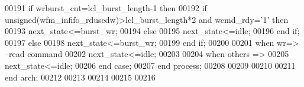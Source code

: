 \begin{DoxyCode}
00191             \textcolor{keywordflow}{if} \textcolor{vhdlchar}{wrburst_cnt}\textcolor{vhdlchar}{=}\textcolor{vhdlchar}{lcl_burst_length}\textcolor{vhdlchar}{-}\textcolor{vhdllogic}{}\textcolor{vhdllogic}{1} \textcolor{keywordflow}{then} 
00192                 \textcolor{keywordflow}{if} \textcolor{comment}{unsigned}\textcolor{vhdlchar}{(}\textcolor{vhdlchar}{wfm_infifo_rdusedw}\textcolor{vhdlchar}{)}\textcolor{vhdlchar}{>}\textcolor{vhdlchar}{lcl_burst_length}\textcolor{vhdlchar}{*}\textcolor{vhdllogic}{}\textcolor{vhdllogic}{2} \textcolor{keywordflow}{and} \textcolor{vhdlchar}{wcmd_rdy}\textcolor{vhdlchar}{=}\textcolor{vhdlchar}{'}\textcolor{vhdllogic}{}\textcolor{vhdllogic}{1}\textcolor{vhdlchar}{'} \textcolor{keywordflow}{then} 
00193                     \textcolor{vhdlchar}{next_state}\textcolor{vhdlchar}{<=}\textcolor{vhdlchar}{burst\_wr};
00194                 \textcolor{keywordflow}{else} 
00195                     \textcolor{vhdlchar}{next_state}\textcolor{vhdlchar}{<=}\textcolor{vhdlchar}{idle};
00196                 \textcolor{keywordflow}{end} \textcolor{keywordflow}{if};
00197             \textcolor{keywordflow}{else} 
00198                 \textcolor{vhdlchar}{next_state}\textcolor{vhdlchar}{<=}\textcolor{vhdlchar}{burst\_wr};
00199             \textcolor{keywordflow}{end} \textcolor{keywordflow}{if};
00200 
00201         \textcolor{keywordflow}{when} \textcolor{vhdlchar}{wr}\textcolor{vhdlchar}{=}\textcolor{vhdlchar}{>}\textcolor{keyword}{       --read command}
00202             \textcolor{vhdlchar}{next_state}\textcolor{vhdlchar}{<=}\textcolor{vhdlchar}{idle};
00203 
00204         \textcolor{keywordflow}{when} \textcolor{keywordflow}{others} \textcolor{vhdlchar}{=}\textcolor{vhdlchar}{>} 
00205             \textcolor{vhdlchar}{next_state}\textcolor{vhdlchar}{<=}\textcolor{vhdlchar}{idle};
00206     \textcolor{keywordflow}{end} \textcolor{keywordflow}{case};
00207 \textcolor{keywordflow}{end} \textcolor{keywordflow}{process};
00208 
00209 
00210   
00211 \textcolor{keywordflow}{end} \textcolor{vhdlchar}{arch};   
00212 
00213 
00214 
00215 
00216 
\end{DoxyCode}
